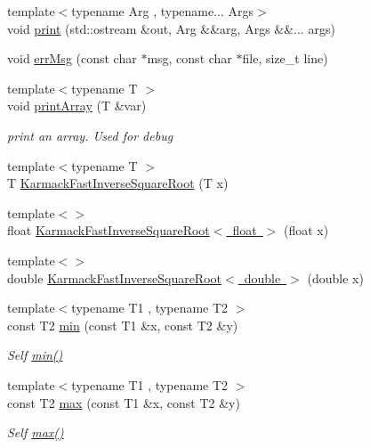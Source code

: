 \begin{DoxyCompactItemize}
{\footnotesize template$<$typename Arg , typename... Args$>$ }\\void \mbox{\hyperlink{namespace_space_h_a6385589ed6d5605c4937955f10f6a03f}{print}} (std\+::ostream \&out, Arg \&\&arg, Args \&\&... args)
\item 
void \mbox{\hyperlink{namespace_space_h_af7bd0f1f17522b3122fa19f037a12ccc}{err\+Msg}} (const char $\ast$msg, const char $\ast$file, size\+\_\+t line)
\item 
{\footnotesize template$<$typename T $>$ }\\void \mbox{\hyperlink{namespace_space_h_aaed936948bcfcfbdb0154ccd6b738f3b}{print\+Array}} (T \&var)
\begin{DoxyCompactList}\small\item\em print an array. Used for debug \end{DoxyCompactList}\item 
{\footnotesize template$<$typename T $>$ }\\T \mbox{\hyperlink{namespace_space_h_a6f9186645e56cf594b0313cb4dcdfcaf}{Karmack\+Fast\+Inverse\+Square\+Root}} (T x)
\item 
{\footnotesize template$<$$>$ }\\float \mbox{\hyperlink{namespace_space_h_a69962a0b8bd4fdde5ac11186edf6e70c}{Karmack\+Fast\+Inverse\+Square\+Root$<$ float $>$}} (float x)
\item 
{\footnotesize template$<$$>$ }\\double \mbox{\hyperlink{namespace_space_h_aa74413df874813f49e37db1dc66d82b8}{Karmack\+Fast\+Inverse\+Square\+Root$<$ double $>$}} (double x)
\item 
{\footnotesize template$<$typename T1 , typename T2 $>$ }\\const T2 \mbox{\hyperlink{namespace_space_h_a2fac2c0f208348efc355314a88754b4a}{min}} (const T1 \&x, const T2 \&y)
\begin{DoxyCompactList}\small\item\em Self \mbox{\hyperlink{namespace_space_h_a2fac2c0f208348efc355314a88754b4a}{min()}} \end{DoxyCompactList}\item 
{\footnotesize template$<$typename T1 , typename T2 $>$ }\\const T2 \mbox{\hyperlink{namespace_space_h_aacd80a06ba9a8b2381301a3917d79cbe}{max}} (const T1 \&x, const T2 \&y)
\begin{DoxyCompactList}\small\item\em Self \mbox{\hyperlink{namespace_space_h_aacd80a06ba9a8b2381301a3917d79cbe}{max()}} \end{DoxyCompactList}\item 

\end{DoxyCompactItemize}
